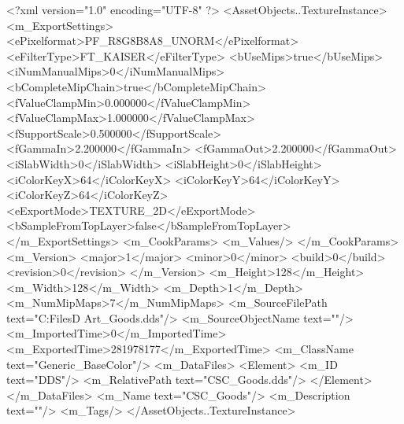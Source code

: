 <?xml version="1.0" encoding="UTF-8" ?>
<AssetObjects..TextureInstance>
	<m_ExportSettings>
		<ePixelformat>PF_R8G8B8A8_UNORM</ePixelformat>
		<eFilterType>FT_KAISER</eFilterType>
		<bUseMips>true</bUseMips>
		<iNumManualMips>0</iNumManualMips>
		<bCompleteMipChain>true</bCompleteMipChain>
		<fValueClampMin>0.000000</fValueClampMin>
		<fValueClampMax>1.000000</fValueClampMax>
		<fSupportScale>0.500000</fSupportScale>
		<fGammaIn>2.200000</fGammaIn>
		<fGammaOut>2.200000</fGammaOut>
		<iSlabWidth>0</iSlabWidth>
		<iSlabHeight>0</iSlabHeight>
		<iColorKeyX>64</iColorKeyX>
		<iColorKeyY>64</iColorKeyY>
		<iColorKeyZ>64</iColorKeyZ>
		<eExportMode>TEXTURE_2D</eExportMode>
		<bSampleFromTopLayer>false</bSampleFromTopLayer>
	</m_ExportSettings>
	<m_CookParams>
		<m_Values/>
	</m_CookParams>
	<m_Version>
		<major>1</major>
		<minor>0</minor>
		<build>0</build>
		<revision>0</revision>
	</m_Version>
	<m_Height>128</m_Height>
	<m_Width>128</m_Width>
	<m_Depth>1</m_Depth>
	<m_NumMipMaps>7</m_NumMipMaps>
	<m_SourceFilePath text="C:\Users\Shadow\Desktop\Working Files\2D Art\Adjacencies\CSC_Goods.dds"/>
	<m_SourceObjectName text=""/>
	<m_ImportedTime>0</m_ImportedTime>
	<m_ExportedTime>281978177</m_ExportedTime>
	<m_ClassName text="Generic_BaseColor"/>
	<m_DataFiles>
		<Element>
			<m_ID text="DDS"/>
			<m_RelativePath text="CSC_Goods.dds"/>
		</Element>
	</m_DataFiles>
	<m_Name text="CSC_Goods"/>
	<m_Description text=""/>
	<m_Tags/>
</AssetObjects..TextureInstance>

